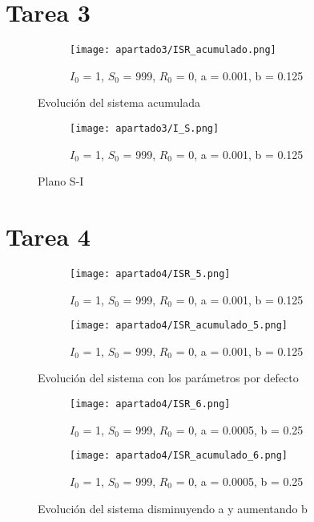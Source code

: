 \section{Tarea 3}

\begin{figure}[H]
	\centering
	\begin{subfigure}[b]{0.8\textwidth}
		\centering
		\texttt{[image: apartado3/ISR\_acumulado.png]}
		\caption{$I_0$ = 1, $S_0$ = 999, $R_0$ = 0, a = 0.001, b = 0.125}
	\end{subfigure}
	\caption{Evolución del sistema acumulada}
\end{figure}
\begin{figure}[H]
	\centering
	\begin{subfigure}[b]{0.8\textwidth}
		\centering
		\texttt{[image: apartado3/I\_S.png]}
		\caption{$I_0$ = 1, $S_0$ = 999, $R_0$ = 0, a = 0.001, b = 0.125}
	\end{subfigure}
	\caption{Plano S-I}
\end{figure}

\section{Tarea 4}
\begin{figure}[H]
	\centering
	\begin{subfigure}[b]{0.8\textwidth}
		\centering
		\texttt{[image: apartado4/ISR\_5.png]}
		\caption{$I_0$ = 1, $S_0$ = 999, $R_0$ = 0, a = 0.001, b = 0.125}
	\end{subfigure}
	\hfill
	\begin{subfigure}[b]{0.8\textwidth}
		\centering
		\texttt{[image: apartado4/ISR\_acumulado\_5.png]}
		\caption{$I_0$ = 1, $S_0$ = 999, $R_0$ = 0, a = 0.001, b = 0.125}
	\end{subfigure}
	\caption{Evolución del sistema con los parámetros por defecto}
\end{figure}
\begin{figure}[H]
	\centering
	\begin{subfigure}[b]{0.8\textwidth}
		\centering
		\texttt{[image: apartado4/ISR\_6.png]}
		\caption{$I_0$ = 1, $S_0$ = 999, $R_0$ = 0, a = 0.0005, b = 0.25}
	\end{subfigure}
	\hfill
	\begin{subfigure}[b]{0.8\textwidth}
		\centering
		\texttt{[image: apartado4/ISR\_acumulado\_6.png]}
		\caption{$I_0$ = 1, $S_0$ = 999, $R_0$ = 0, a = 0.0005, b = 0.25}
	\end{subfigure}
	\caption{Evolución del sistema disminuyendo a y aumentando b}
\end{figure}

